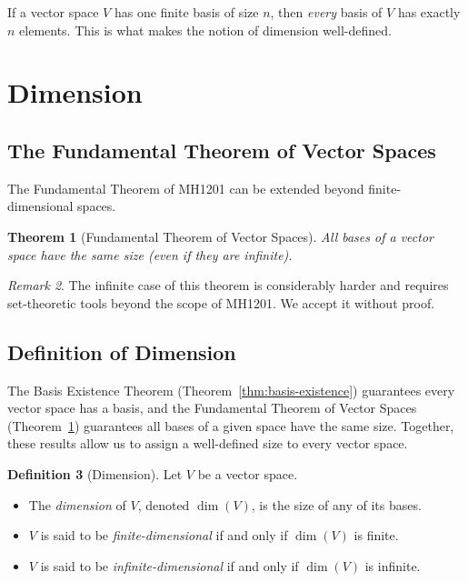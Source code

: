 \documentclass[11pt, a4paper, notitlepage]{report}
\newtheorem{theorem}{Theorem}[section]
\theoremstyle{definition}
\newtheorem{definition}[theorem]{Definition}
\theoremstyle{remark}
\newtheorem{remark}[theorem]{Remark}
\begin{document}
\begin{keyresult}[title={Key Result: All Finite Bases Have the Same Size}]
If a vector space $V$ has one finite basis of size $n$, then \emph{every} basis of $V$ has exactly $n$ elements. This is what makes the notion of dimension well-defined.
\end{keyresult}

\section{Dimension}
\label{sec:dimension}

\subsection{The Fundamental Theorem of Vector Spaces}

The Fundamental Theorem of MH1201 can be extended beyond finite-dimensional spaces.

\begin{theorem}[Fundamental Theorem of Vector Spaces]\label{thm:fund-thm-vs}
All bases of a vector space have the same size (even if they are infinite).
\end{theorem}

\begin{remark}
The infinite case of this theorem is considerably harder and requires set-theoretic tools beyond the scope of MH1201. We accept it without proof.
\end{remark}

\subsection{Definition of Dimension}

The Basis Existence Theorem (Theorem~\ref{thm:basis-existence}) guarantees every vector space has a basis, and the Fundamental Theorem of Vector Spaces (Theorem~\ref{thm:fund-thm-vs}) guarantees all bases of a given space have the same size. Together, these results allow us to assign a well-defined size to every vector space.

\begin{definition}[Dimension]\label{def:dimension}
Let $V$ be a vector space.
\begin{itemize}
  \item The \emph{dimension} of $V$, denoted $\dim(V)$, is the size of any of its bases.
  \item $V$ is said to be \emph{finite-dimensional} if and only if $\dim(V)$ is finite.
  \item $V$ is said to be \emph{infinite-dimensional} if and only if $\dim(V)$ is infinite.
\end{itemize}
\end{definition}
\end{document}
